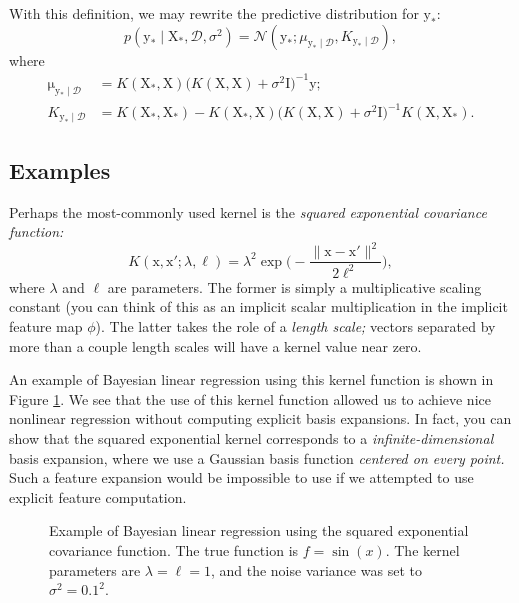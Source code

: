 \documentclass{article}
\newcommand{\given}{\mid}
\newcommand{\mc}[1]{\mathcal{#1}}
\newcommand{\data}{\mc{D}}
\newcommand{\inv}{^{-1}}
\newcommand{\mat}[1]{\bm{\mathrm{#1}}}
\renewcommand{\vec}[1]{\bm{\mathrm{#1}}}
\begin{document}
With this definition, we may rewrite the predictive distribution
for $\vec{y}_\ast$:
\begin{equation*}
  p(\vec{y}_\ast \given \mat{X}_\ast, \data, \sigma^2)
  =
  \mc{N}(
  \vec{y}_\ast;
  \mu_{\vec{y}_\ast \given \data},
  K_{\vec{y}_\ast \given \data}),
\end{equation*}
where
\begin{align*}
  \vec{\mu}_{\vec{y}_\ast\given\data}
  &=
  K(\mat{X}_\ast, \mat{X})
  \bigl(K(\mat{X}, \mat{X}) + \sigma^2 \mat{I}\bigr)\inv
  \vec{y};
  \\
  K_{\vec{y}_\ast\given\data}
  &=
  K(\vec{X}_\ast, \vec{X}_\ast)
  -
  K(\mat{X}_\ast, \mat{X})
  \bigl(K(\mat{X}, \mat{X}) + \sigma^2 \mat{I}\bigr)\inv
  K(\mat{X}, \mat{X}_\ast).
\end{align*}

\subsection*{Examples}

Perhaps the most-commonly used kernel is the \emph{squared exponential
  covariance function:}
\begin{equation*}
  K(\vec{x}, \vec{x}'; \lambda, \ell)
  =
  \lambda^2
  \exp\biggl(-\frac{\lVert \vec{x} - \vec{x}' \rVert^2}{2\ell^2}\biggr),
\end{equation*}
where $\lambda$ and $\ell$ are parameters.  The former is simply a
multiplicative scaling constant (you can think of this as an implicit
scalar multiplication in the implicit feature map $\phi$).  The latter
takes the role of a \emph{length scale;} vectors separated by more
than a couple length scales will have a kernel value near zero.

An example of Bayesian linear regression using this kernel function is
shown in Figure \ref{kernel_example}.  We see that the use of this
kernel function allowed us to achieve nice nonlinear regression
without computing explicit basis expansions.  In fact, you can show
that the squared exponential kernel corresponds to a
\emph{infinite-dimensional} basis expansion, where we use a Gaussian
basis function \emph{centered on every point.}  Such a feature
expansion would be impossible to use if we attempted to use explicit
feature computation.

\begin{figure}
  \centering
  
  \caption{Example of Bayesian linear regression using the squared
    exponential covariance function.  The true function is $f =
    \sin(x)$.  The kernel parameters are $\lambda = \ell = 1$, and the
    noise variance was set to $\sigma^2 = 0.1^2$.}
  \label{kernel_example}
\end{figure}
\end{document}
